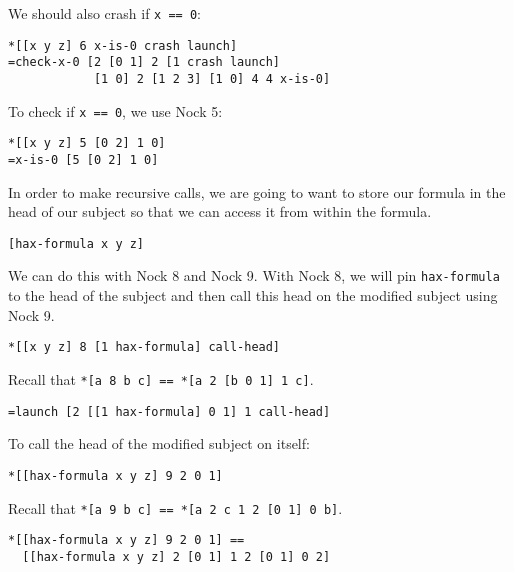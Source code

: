\documentclass[twoside]{article}
\begin{document}
\noindent
We should also crash if \lstinline[style=inlinecode]{x == 0}:

\begin{lstlisting}[style=listingblock]
*[[x y z] 6 x-is-0 crash launch]
=check-x-0 [2 [0 1] 2 [1 crash launch]
            [1 0] 2 [1 2 3] [1 0] 4 4 x-is-0]
\end{lstlisting}

\noindent
To check if \lstinline[style=inlinecode]{x == 0}, we use Nock 5:

\begin{lstlisting}[style=listingblock]
*[[x y z] 5 [0 2] 1 0]
=x-is-0 [5 [0 2] 1 0]
\end{lstlisting}

\noindent
In order to make recursive calls, we are going to want to store our formula in the head of our subject so that we can access it from within the formula.

\begin{lstlisting}[style=listingblock]
[hax-formula x y z]
\end{lstlisting}

\noindent
We can do this with Nock 8 and Nock 9. With Nock 8, we will pin \lstinline[style=inlinecode]{hax-formula} to the head of the subject and then call this head on the modified subject using Nock 9.

\begin{lstlisting}[style=listingblock]
*[[x y z] 8 [1 hax-formula] call-head]
\end{lstlisting}

\noindent
Recall that \lstinline[style=inlinecode]{*[a 8 b c] == *[a 2 [b 0 1] 1 c]}.

\begin{lstlisting}[style=listingblock]
=launch [2 [[1 hax-formula] 0 1] 1 call-head]
\end{lstlisting}

\noindent
To call the head of the modified subject on itself:

\begin{lstlisting}[style=listingblock]
*[[hax-formula x y z] 9 2 0 1]
\end{lstlisting}

\noindent
Recall that \lstinline[style=inlinecode]{*[a 9 b c] == *[a 2 c 1 2 [0 1] 0 b]}.

\begin{lstlisting}[style=listingblock]
*[[hax-formula x y z] 9 2 0 1] ==
  [[hax-formula x y z] 2 [0 1] 1 2 [0 1] 0 2]
\end{lstlisting}
\end{document}
